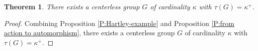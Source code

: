 \documentclass[10pt,a4paper]{amsart}
\theoremstyle{plain}
\newtheorem{theorem}{Theorem}[section]
\theoremstyle{definition}
\begin{document}
\begin{theorem}\label{T:main}
    There exists a centerless group $G$ of cardinality $\kappa$ with $\tau(G)=\kappa^+$.
\end{theorem}

\begin{proof}
    Combining Proposition \ref{P:Hartley-example} and Proposition \ref{P:from action to automorphism}, there exists a centerless group $G$ of cardinality $\kappa$ with $\tau(G)=\kappa^+$.
\end{proof}



\end{document}
